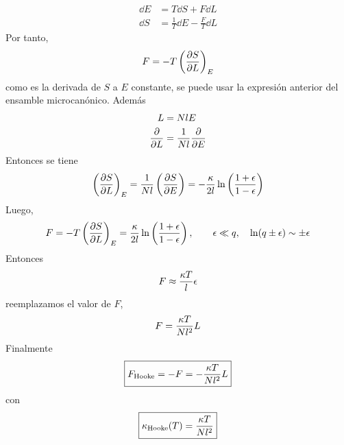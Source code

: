 \begin{align}
  \dd E&=T\dd S+F\dd L\\
  \dd S&=\frac{1}{T}\dd E-\frac{F}{T}\dd L
\end{align}
Por tanto, \begin{equation}
  F=-T\left(\pdv{S}{L}\right)_E
\end{equation}
como es la derivada de $S$ a $E$ constante, se puede usar la expresión anterior del ensamble microcanónico. Además
\begin{align}
  L&=Nl E\\
  \pdv{L}&=\frac{1}{Nl}\pdv{E}
\end{align}
Entonces se tiene
\begin{equation}
  \left(\pdv{S}{L}\right)_E=\frac{1}{Nl}\left(\pdv{S}{E}\right)=-\frac{\kappa }{2l}\ln\left(\frac{1+\epsilon}{1-\epsilon}\right)
\end{equation}
Luego,
\begin{equation}
  F=-T\left(\pdv{S}{L}\right)_E=\frac{\kappa }{2l}\ln\left(\frac{1+\epsilon}{1-\epsilon}\right),\qquad \epsilon\ll q,\quad \ln(q\pm \epsilon)\sim \pm \epsilon
\end{equation}
Entonces
\begin{equation}
  F\approx \frac{\kappa T}{l}\epsilon
\end{equation}
reemplazamos el valor de $F$,
\begin{equation}
  F=\frac{\kappa T}{N l^2}L
\end{equation}
Finalmente
\begin{equation}
\boxed{  F_{\rm Hooke}=-F=-\frac{\kappa T}{Nl^2}L}
\end{equation}
con
\begin{equation}
\boxed{  \kappa_{\rm Hooke}(T)=\frac{\kappa T}{Nl^2}}
\end{equation}




















































